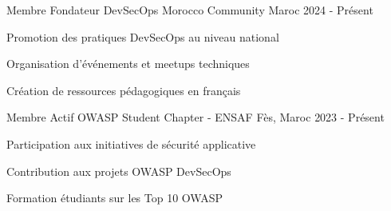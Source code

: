 
\begin{cventries}

    \cventry
    {Membre Fondateur} %
    {DevSecOps Morocco Community} %
    {Maroc} %
    {2024 - Présent} %
    {
        \begin{cvitems}
            \item {Promotion des pratiques DevSecOps au niveau national}
            \item {Organisation d'événements et meetups techniques}
            \item {Création de ressources pédagogiques en français}
        \end{cvitems}
    }

    \cventry
    {Membre Actif} %
    {OWASP Student Chapter - ENSAF} %
    {Fès, Maroc} %
    {2023 - Présent} %
    {
        \begin{cvitems}
            \item {Participation aux initiatives de sécurité applicative}
            \item {Contribution aux projets OWASP DevSecOps}
            \item {Formation étudiants sur les Top 10 OWASP}
        \end{cvitems}
    }

\end{cventries}